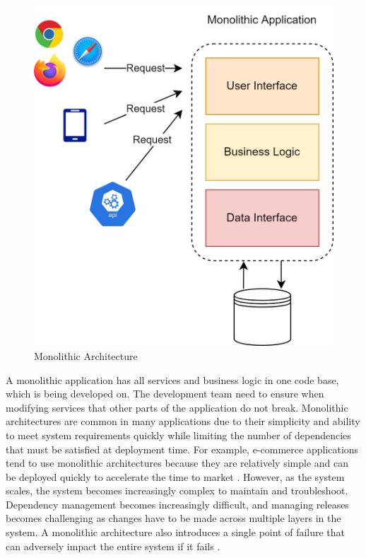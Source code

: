 \documentclass[BIF,Bachelor,nenglish]{twbook}%
\begin{document}
\begin{figure} [H]
 \begin{center}
    \includegraphics[width=0.7\linewidth]{img/Monolith.png}
 \end{center}
 \caption{Monolithic Architecture}
 \label{monolith}
\end{figure}

\noindent
A monolithic application has all services and business logic in one code base, which is being developed on. The development team need to ensure when modifying services that other parts of the application do not break. Monolithic architectures are common in many applications due to their simplicity and ability to meet system requirements quickly while limiting the number of dependencies that must be satisfied at deployment time. For example, e-commerce applications tend to use monolithic architectures because they are relatively simple and can be deployed quickly to accelerate the time to market \cite{frommonotomicro}. However, as the system scales, the system becomes increasingly complex to maintain and troubleshoot. Dependency management becomes increasingly difficult, and managing releases becomes challenging as changes have to be made across multiple layers in the system. A monolithic architecture also introduces a single point of failure that can adversely impact the entire system if it fails \cite{vil2015}.

\end{document}
